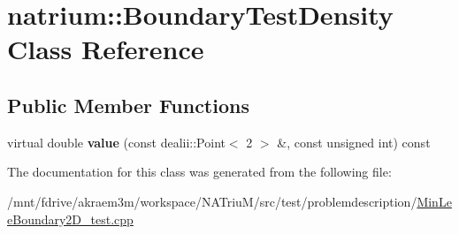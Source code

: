 \hypertarget{classnatrium_1_1BoundaryTestDensity}{
\section{natrium::BoundaryTestDensity Class Reference}
\label{classnatrium_1_1BoundaryTestDensity}
}
\subsection*{Public Member Functions}
\begin{DoxyCompactItemize}
\item 
\hypertarget{classnatrium_1_1BoundaryTestDensity_af485f34989fac863e20d1827f379cfa6}{
virtual double {\bfseries value} (const dealii::Point$<$ 2 $>$ \&, const unsigned int) const }
\label{classnatrium_1_1BoundaryTestDensity_af485f34989fac863e20d1827f379cfa6}

\end{DoxyCompactItemize}


The documentation for this class was generated from the following file:\begin{DoxyCompactItemize}
\item 
/mnt/fdrive/akraem3m/workspace/NATriuM/src/test/problemdescription/\hyperlink{MinLeeBoundary2D__test_8cpp}{MinLeeBoundary2D\_\-test.cpp}\end{DoxyCompactItemize}
